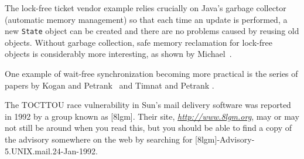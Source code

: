 The lock-free ticket vendor example relies crucially on Java's garbage collector (automatic memory management) so that each time an update is performed, a new \texttt{State} object can be created and there are no problems caused by reusing old objects.  Without garbage collection, safe memory reclamation for lock-free objects is considerably more interesting, as shown by Michael~\cite{max1203}.

One example of wait-free synchronization becoming more practical is the series of papers by Kogan and Petrank~\cite{Kogan:2011:WQM:1941553.1941585,Kogan:2012:MCF:2145816.2145835} and Timnat and Petrank \cite{Timnat:2014:PWS:2555243.2555261}.

The TOCTTOU race vulnerability in Sun's mail delivery software was
reported in 1992 by a group known as [8lgm].  Their site,
\textit{\url{http://www.8lgm.org}}, may or may not still be around when you read
this, but you should be able to find a copy of the advisory somewhere
on the web by searching for [8lgm]-Advisory-5.UNIX.mail.24-Jan-1992.
